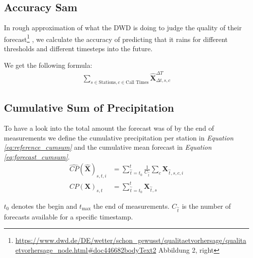 \documentclass{article}
\theoremstyle{plain}
\theoremstyle{definition}
\theoremstyle{remark}
\begin{document}


\subsection{Accuracy Sam}

In rough approximation of what the DWD is doing to judge the quality of their forecast\footnote{\url{https://www.dwd.de/DE/wetter/schon_gewusst/qualitaetvorhersage/qualitaetvorhersage_node.html\#doc446682bodyText2} Abbildung 2, right} 
, we calculate the accuracy of predicting that it rains for different thresholds and different timesteps into the future.

We get the following formula:
\begin{align}
    \sum_{s \in \text{Stations},c \in \text{Call Times}}
    \hat{\textbf{X}}_{\Delta t, s, c}^{\Delta T}
\end{align}



\subsection{Cumulative Sum of Precipitation}

To have a look into the total amount the forecast was of by the end of measurements we define the cumulative precipitation per station in \textit{Equation \ref{eq:reference_cumsum}} and the cumulative mean forecast in \textit{Equation \ref{eq:forecast_cumsum}}. 
\begin{align}
    \widehat{CP}(\hat{\textbf{X}})_{s, t, i} &=  \sum_{\overset{\sim}{t} = t_0}^{t} \frac{1}{C_{\overset{\sim}{t}}}\sum_c \textbf{X}_{\overset{\sim}{t}, s, c,  i}
    \label{eq:forecast_cumsum}\\ 
    CP(\textbf{X})_{s, t} &= \sum_{\overset{\sim}{t} = t_0}^{t} \textbf{X}_{\overset{\sim}{t}, s}
    \label{eq:reference_cumsum}
\end{align}

$t_0$ denotes the begin and $t_{\max}$ the end of measurements. $C_{\overset{\sim}{t}}$ is the number of forecasts available for a specific timestamp.
\end{document}
